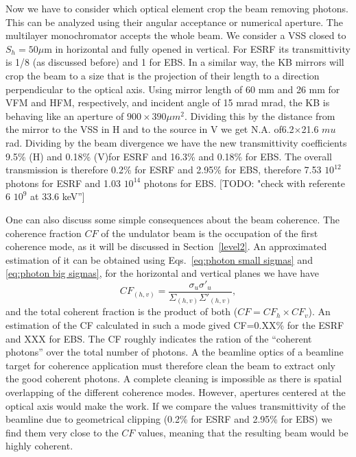 \documentclass{iucr}              %
\newcommand{\todo}[1]{{\color{red}[TODO: "#1'']}}
\begin{document}
Now we have to consider which optical element crop the beam removing photons. This can be analyzed using their angular acceptance or numerical aperture. The multilayer monochromator accepts the whole beam. We consider a VSS closed to $S_h=50 \mu$m in horizontal and fully opened in vertical. For ESRF its transmittivity is 1/8 (as discussed before) and 1 for EBS. In a similar way, the KB mirrors will crop the beam to a size that is the projection of their length to a direction perpendicular to the optical axis. Using mirror length of 60 mm and 26 mm for VFM and HFM, respectively, and incident angle of 15 mrad mrad, the KB is behaving like an aperture of $900 \times 390 \mu m^2$. Dividing this by the distance from the mirror to the VSS in H and to the source in V we get N.A. of6.2$\times$21.6 $mu$rad. Dividing by the beam divergence we have the new transmittivity coefficients 9.5\% (H) and 0.18\% (V)for ESRF and 16.3\% and 0.18\% for EBS. The overall transmission is therefore 0.2\% for ESRF and 2.95\% for EBS, therefore 7.53 $10^{12}$ photons for ESRF and 1.03 $10^{14}$ photons for EBS. \todo{check with referente 6 $10^9$ at 33.6 keV}

One can also discuss some simple consequences about the beam coherence. The coherence fraction $CF$ \cite{arxivCF} of the undulator beam is the occupation of the first coherence mode, as it will be discussed in Section~\ref{level2}. An approximated estimation of it can be obtained using Eqs.~\ref{eq:photon small sigmas} and \ref{eq:photon big sigmas}, for the horizontal and vertical planes we have have
\begin{equation}
 CF_{(h,v)} = \frac{\sigma_u \sigma'_u}{\Sigma_{(h,v)} \Sigma'_{(h,v)}},
\end{equation}
and the total coherent fraction is the product of both ($CF=CF_h \times CF_v$). An estimation of the CF calculated in such a mode gived CF=0.XX\% for the ESRF and XXX for EBS. The CF roughly indicates the ration of the ``coherent photons'' over the total number of photons. A the beamline optics of a beamline target for coherence application must therefore clean the beam to extract only the good coherent photons. A complete cleaning is impossible as there is spatial overlapping of the different coherence modes. However, apertures centered at the optical axis would make the work. If we compare the values transmittivity of the beamline due to geometrical clipping  (0.2\% for ESRF and 2.95\% for EBS) we find them very close to the $CF$ values, meaning that the resulting beam would be highly coherent. 
\end{document}
